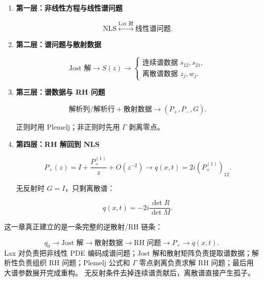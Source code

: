 \documentclass[
    lang=cn,
    scheme=chinese,
    mode=simple,
    device=normal,
    color=blue,
    math=cm,
    thmcnt=section,
    12pt,
    nowatermark
]{elegantbook}
\begin{document}
\begin{enumerate}
    \item \textbf{第一层：非线性方程与线性谱问题}

          \[
              \text{NLS}
              \overset{\text{Lax 对}}{\longleftrightarrow}
              \text{线性谱问题}.
          \]

    \item \textbf{第二层：谱问题与散射数据}

          \[
              \text{Jost 解}
              \longrightarrow
              S(z)
              \longrightarrow
              \begin{cases}
                  \text{连续谱数据 }s_{12},s_{21}, \\
                  \text{离散谱数据 }z_j,w_j.
              \end{cases}
          \]

    \item \textbf{第三层：谱数据与 RH 问题}

          \[
              \text{解析列/解析行}
              +
              \text{散射数据}
              \longrightarrow
              (P_+,P_-,G).
          \]

          正则时用 Plemelj；非正则时先用 $\Gamma$ 剥离零点。

    \item \textbf{第四层：RH 解回到 NLS}

          \[
              P_+(z)
              =
              I+\dfrac{P_+^{(1)}}{z}+O(z^{-2})
              \longrightarrow
              q(x,t)=2i(P_+^{(1)})_{12}.
          \]

          无反射时 $G=I$，只剩离散谱：

          \[
              q(x,t)
              =
              -2i\dfrac{\det R}{\det M}.
          \]
\end{enumerate}

\begin{callout}[组会最后一句]
    这一章真正建立的是一条完整的逆散射/RH 链条：

    \[
        \boxed{
            q_0
            \longrightarrow
            \text{Jost 解}
            \longrightarrow
            \text{散射数据}
            \longrightarrow
            \text{RH 问题}
            \longrightarrow
            P_+
            \longrightarrow
            q(x,t).
        }
    \]
    Lax 对负责把非线性 PDE 编码成谱问题；Jost 解和散射矩阵负责提取谱数据；解析性负责组织 RH 问题；Plemelj 公式和 $\Gamma$ 零点剥离负责求解 RH 问题；最后用大谱参数展开完成重构。
    无反射条件去掉连续谱贡献后，离散谱直接产生孤子。
\end{callout}
\end{document}
